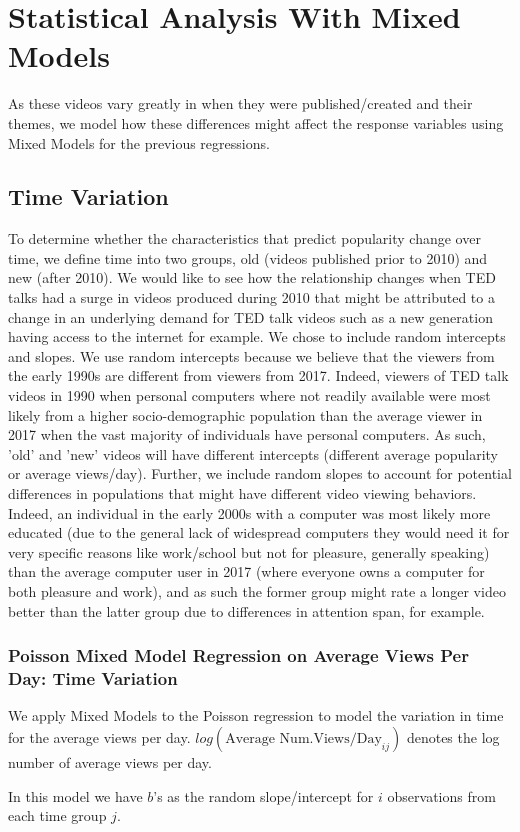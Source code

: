 \section{Statistical Analysis With Mixed Models}
As these videos vary greatly in when they were published/created and their themes, we model how these differences might affect the response variables using Mixed Models for the previous regressions. 
\subsection{Time Variation}
To determine whether the characteristics that predict popularity change over time, we define time into two groups, old (videos published prior to 2010) and new (after 2010). 
We would like to see how the relationship changes when TED talks had a surge in videos produced during 2010 that might be attributed to a change in an underlying demand for TED talk videos such as a new generation having access to the internet for example. 
We chose to include random intercepts and slopes. 
We use random intercepts because we believe that the viewers from the early 1990s are different from viewers from 2017. Indeed, viewers of TED talk videos in 1990 when personal computers where not readily available were most likely from a higher socio-demographic population than the average viewer in 2017 when the vast majority of individuals have personal computers. As such, 'old' and 'new' videos will have different intercepts (different average popularity or average views/day).
Further, we include random slopes to account for potential differences in populations that might have different video viewing behaviors. Indeed, an individual in the early 2000s with a computer was most likely more educated (due to the general lack of widespread computers they would need it for very specific reasons like work/school but not for pleasure, generally speaking) than the average computer user in 2017 (where everyone owns a computer for both pleasure and work), and as such the former group might rate a longer video better than the latter group due to differences in attention span, for example. 

\subsubsection{Poisson Mixed Model Regression on Average Views Per Day: Time Variation}
We apply Mixed Models to the Poisson regression to model the variation in time for the average views per day. $log(\text{Average Num.Views/Day}_{ij})$ denotes the log number of average views per day.

In this model we have $b$'s as the random slope/intercept for $i$ observations from each time group $j$.


